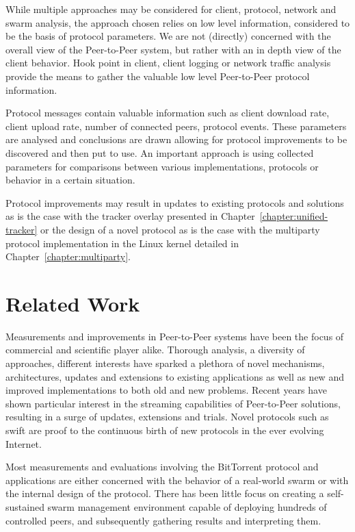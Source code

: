 While multiple approaches may be considered for client, protocol, network and
swarm analysis, the approach chosen relies on low level information,
considered to be the basis of protocol parameters. We are not (directly)
concerned with the overall view of the Peer-to-Peer system, but rather with an
in depth view of the client behavior. Hook point in client, client logging or
network traffic analysis provide the means to gather the valuable low level
Peer-to-Peer protocol information.

Protocol messages contain valuable information such as client download rate,
client upload rate, number of connected peers, protocol events. These
parameters are analysed and conclusions are drawn allowing for protocol
improvements to be discovered and then put to use. An important approach is
using collected parameters for comparisons between various implementations,
protocols or behavior in a certain situation.

Protocol improvements may result in updates to existing protocols and
solutions as is the case with the tracker overlay presented in
Chapter~\ref{chapter:unified-tracker} or the design of a novel protocol as is
the case with the multiparty protocol implementation in the Linux kernel
detailed in Chapter~\ref{chapter:multiparty}.

\section{Related Work}
\label{sec:intro:related}

Measurements and improvements in Peer-to-Peer systems have been the focus of
commercial and scientific player alike. Thorough analysis, a diversity of
approaches, different interests have sparked a plethora of novel mechanisms,
architectures, updates and extensions to existing applications as well as new
and improved implementations to both old and new problems. Recent years have
shown particular interest in the streaming capabilities of Peer-to-Peer
solutions, resulting in a surge of updates, extensions and trials. Novel
protocols such as swift are proof to the continuous birth of new protocols in
the ever evolving Internet.

Most measurements and evaluations involving the BitTorrent protocol and
applications are either concerned with the behavior of a real-world swarm or
with the internal design of the protocol. There has been little focus on
creating a self-sustained swarm management environment capable of deploying
hundreds of controlled peers, and subsequently gathering results and
interpreting them.

